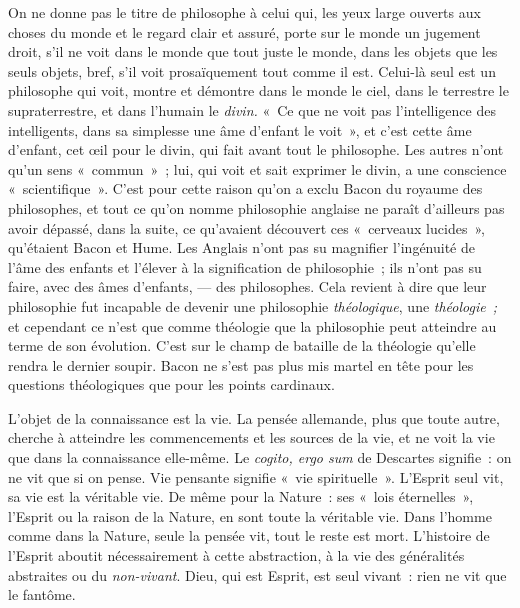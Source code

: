 \documentclass[french,twoside]{book} %
\begin{document}
On ne donne pas le titre de philosophe à celui qui, les yeux large ouverts aux choses du monde et le regard clair et assuré, porte sur le monde un jugement droit, s’il ne voit dans le monde que tout juste  le monde, dans les objets que les seuls objets, bref, s’il voit prosaïquement tout comme il est. Celui-là seul est un philosophe qui voit, montre et démontre dans le monde le ciel, dans le terrestre le supraterrestre, et dans l’humain le \emph{divin.} « Ce que ne voit pas l’intelligence des intelligents, dans sa simplesse une âme d’enfant le voit », et c’est cette âme d’enfant, cet œil pour le divin, qui fait avant tout le philosophe. Les autres n’ont qu’un sens « commun » ; lui, qui voit et sait exprimer le divin, a une conscience « scientifique ». C’est pour cette raison qu’on a exclu Bacon du royaume des philosophes, et tout ce qu’on nomme philosophie anglaise ne paraît d’ailleurs pas avoir dépassé, dans la suite, ce qu’avaient découvert ces « cerveaux lucides », qu’étaient Bacon et Hume. Les Anglais n’ont pas su magnifier l’ingénuité de l’âme des enfants et l’élever à la signification de philosophie ; ils n’ont pas su faire, avec des âmes d’enfants, — des philosophes. Cela revient à dire que leur philosophie fut incapable de devenir une philosophie \emph{théologique}, une \emph{théologie ;} et cependant ce n’est que comme théologie que la philosophie peut atteindre au terme de son évolution. C’est sur le champ de bataille de la théologie qu’elle rendra le dernier soupir. Bacon ne s’est pas plus mis martel en tête pour les questions théologiques que pour les points cardinaux.\par
L’objet de la connaissance est la vie. La pensée allemande, plus que toute autre, cherche à atteindre les commencements et les sources de la vie, et ne voit la vie que dans la connaissance elle-même. Le \emph{cogito, ergo sum} de Descartes signifie : on ne vit que si on pense. Vie pensante signifie « vie spirituelle ». L’Esprit seul vit, sa vie est la véritable vie. De même pour la Nature : ses « lois éternelles », l’Esprit ou la raison de la Nature, en sont toute la véritable vie. Dans l’homme comme dans la Nature, seule la pensée vit, tout le reste est mort. L’histoire de l’Esprit aboutit nécessairement à cette abstraction,  à la vie des généralités abstraites ou du \emph{non-vivant}. Dieu, qui est Esprit, est seul vivant : rien ne vit que le fantôme.\par
\end{document}

